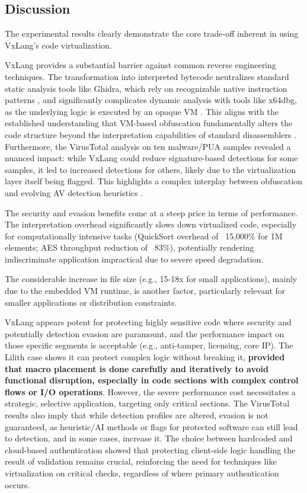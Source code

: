 \subsection{Discussion}
The experimental results clearly demonstrate the core trade-off inherent in using VxLang's code virtualization.

 VxLang provides a substantial barrier against common reverse engineering techniques. The transformation into interpreted bytecode neutralizes standard static analysis tools like Ghidra, which rely on recognizable native instruction patterns \cite{Eilam2011, Ko2007}, and significantly complicates dynamic analysis with tools like x64dbg, as the underlying logic is executed by an opaque VM \cite{Sikorski2012}. This aligns with the established understanding that VM-based obfuscation fundamentally alters the code structure beyond the interpretation capabilities of standard disassemblers \cite{Ore06, Salwan2018SymbolicDeobfuscation}. Furthermore, the VirusTotal analysis on ten malware/PUA samples revealed a nuanced impact: while VxLang could reduce signature-based detections for some samples, it led to increased detections for others, likely due to the virtualization layer itself being flagged. This highlights a complex interplay between obfuscation and evolving AV detection heuristics \cite{Ore06, Salwan2018SymbolicDeobfuscation, Rou13}.

 The security and evasion benefits come at a steep price in terms of performance. The interpretation overhead significantly slows down virtualized code, especially for computationally intensive tasks (QuickSort overhead of ~15,000\% for 1M elements; AES throughput reduction of ~83\%), potentially rendering indiscriminate application impractical due to severe speed degradation.

 The considerable increase in file size (e.g., 15-18x for small applications), mainly due to the embedded VM runtime, is another factor, particularly relevant for smaller applications or distribution constraints.

 VxLang appears potent for protecting highly sensitive code where security and potentially detection evasion are paramount, and the performance impact on those specific segments is acceptable (e.g., anti-tamper, licensing, core IP). The Lilith case shows it can protect complex logic without breaking it, \textbf{provided that macro placement is done carefully and iteratively to avoid functional disruption, especially in code sections with complex control flows or I/O operations}. However, the severe performance cost necessitates a strategic, selective application, targeting only critical sections. The VirusTotal results also imply that while detection profiles are altered, evasion is not guaranteed, as heuristic/AI methods or flags for protected software can still lead to detection, and in some cases, increase it. The choice between hardcoded and cloud-based authentication showed that protecting client-side logic handling the result of validation remains crucial, reinforcing the need for techniques like virtualization on critical checks, regardless of where primary authentication occurs.
